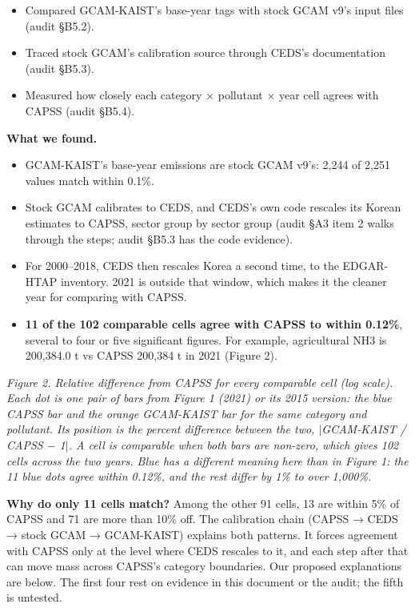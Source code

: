 \begin{itemize}
\tightlist
\item
  Compared
  GCAM-KAIST's
  base-year
  tags
  with
  stock
  GCAM
  v9's
  input
  files
  (audit
  §B5.2).
\item
  Traced
  stock
  GCAM's
  calibration
  source
  through
  CEDS's
  documentation
  (audit
  §B5.3).
\item
  Measured
  how
  closely
  each
  category
  ×
  pollutant
  × year
  cell
  agrees
  with
  CAPSS
  (audit
  §B5.4).
\end{itemize}

\textbf{What
we found.}

\begin{itemize}
\tightlist
\item
  GCAM-KAIST's
  base-year
  emissions
  are
  stock
  GCAM
  v9's:
  2,244 of
  2,251
  values
  match
  within
  0.1\%.
\item
  Stock GCAM calibrates to CEDS, and CEDS's own code rescales its Korean
  estimates to CAPSS, sector group by sector group (audit §A3 item 2 walks
  through the steps; audit §B5.3 has the code evidence).
\item
  For 2000--2018, CEDS then rescales Korea a second time, to the EDGAR-HTAP
  inventory. 2021 is outside that window, which makes it the cleaner year for
  comparing with CAPSS.
\item
  \textbf{11
  of the
  102
  comparable
  cells
  agree
  with
  CAPSS to
  within
  0.12\%},
  several
  to four
  or five
  significant
  figures.
  For
  example,
  agricultural
  NH3 is
  200,384.0
  t vs
  CAPSS
  200,384
  t in
  2021
  (Figure
  2).
\end{itemize}


\emph{Figure 2. Relative difference from CAPSS for every comparable cell
(log scale). Each dot is one pair of bars from Figure 1 (2021) or its 2015
version: the blue CAPSS bar and the orange GCAM-KAIST bar for the same
category and pollutant. Its position is the percent difference between the
two, $|$GCAM-KAIST / CAPSS $-$ 1$|$. A cell is comparable when both bars are
non-zero, which gives 102 cells across the two years. Blue has a different
meaning here than in Figure 1: the 11 blue dots agree within 0.12\%, and the
rest differ by 1\% to over 1,000\%.}

\textbf{Why do only 11 cells match?} Among the other 91 cells, 13 are within
5\% of CAPSS and 71 are more than 10\% off. The calibration chain (CAPSS →
CEDS → stock GCAM → GCAM-KAIST) explains both patterns. It forces agreement
with CAPSS only at the level where CEDS rescales to it, and each step after
that can move mass across CAPSS's category boundaries. Our proposed
explanations are below. The first four rest on evidence in this document or
the audit; the fifth is untested.

